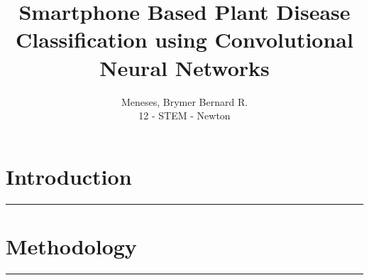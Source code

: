 \documentclass[a4paper, 12pt]{report}
\title{
    Smartphone Based Plant Disease Classification using
    Convolutional Neural Networks
}
\author{
    Meneses, Brymer Bernard R. \\[-4mm]
    {\small 12 - STEM - Newton}
}
\date{}
\newcommand{\sep}{\vspace{-1cm}\noindent\rule{\textwidth}{0.4pt}}
\begin{document}
 

    \maketitle 


    \chapter{Introduction}
    \sep
    
    
    \chapter{Methodology}
    \sep
    
\end{document}
